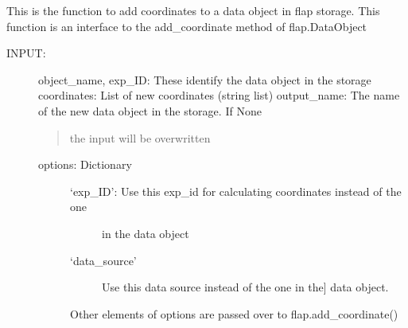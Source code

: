\documentclass[letterpaper,10pt,english]{sphinxmanual}
\begin{document}

\begin{fulllineitems}
\label{\detokenize{data_object:flap.data_object.add_coordinate}}
This is the function to add coordinates to a data object in flap storage.
This function is an interface to the add\_coordinate method of flap.DataObject
\begin{description}
\item[{INPUT:}] \leavevmode
object\_name, exp\_ID: These identify the data object in the storage
coordinates: List of new coordinates (string list)
output\_name: The name of the new data object in the storage. If None
\begin{quote}

the input will be overwritten
\end{quote}
\begin{description}
\item[{options: Dictionary}] \leavevmode\begin{description}
\item[{‘exp\_ID’: Use this exp\_id for calculating coordinates instead of the one}] \leavevmode
in the data object

\item[{‘data\_source’}] \leavevmode{[}Use this data source instead of the one in the{]}
data object.

\end{description}

Other elements of options are passed over to flap.add\_coordinate()

\end{description}

\end{description}

\end{fulllineitems}

\end{document}
